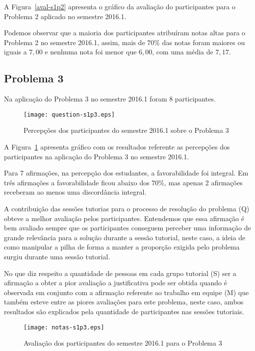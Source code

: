 A Figura~\ref{aval-s1p2} apresenta o gráfico da
avaliação do participantes para o Problema 2 aplicado no semestre 2016.1.

Podemos observar que a maioria dos participantes atribuíram
notas altas para o Problema 2 no semestre 2016.1, assim, mais de $70\%$ das notas
foram maiores ou iguais a $7,00$ e nenhuma nota foi menor que $6,00$, com uma média
de $7,17$.

\subsection{Problema 3}
Na aplicação do Problema 3 no semestre 2016.1 foram 8 participantes.

\begin{figure}[!htb]
\centering
\texttt{[image: question-s1p3.eps]}
\caption{Percepções dos participantes do semestre 2016.1 sobre o Problema 3}
\label{percep-s1p3}
\end{figure}

A Figura~\ref{percep-s1p3} apresenta gráfico com os resultados referente
as percepções dos participantes na aplicação do
Problema 3 no semestre 2016.1.

Para 7 afirmações, na percepção dos estudantes, a favorabilidade foi integral.
Em três afirmações a favorabilidade ficou abaixo dos $70\%$, mas apenas 2
afirmações receberam ao menos uma discordância integral.

A contribuição das sessões tutorias para o processo
de resolução do problema (Q) obteve a melhor avaliação pelos
participantes.
Entendemos que essa afirmação é bem avaliado sempre que
os participantes conseguem perceber uma informação de
grande relevância para a solução durante a sessão
tutorial, neste caso, a ideia de como manipular a pilha
de forma a manter a proporção exigida pelo problema
surgiu durante uma sessão tutorial.

No que diz respeito a quantidade de pessoas em
cada grupo tutorial (S) ser a afirmação a obter a pior
avaliação a justificativa pode ser obtida quando
é observada em conjunto com a afirmação referente ao
trabalho em equipe (M) que também esteve entre
as piores avaliações para este problema, neste caso,
ambos resultados são explicados pela quantidade de
participantes nas sessões tutoriais.

\begin{figure}[!htb]
\centering
\texttt{[image: notas-s1p3.eps]}
\caption{Avaliação dos participantes do semestre 2016.1 para o Problema 3}
\label{aval-s1p3}
\end{figure}

